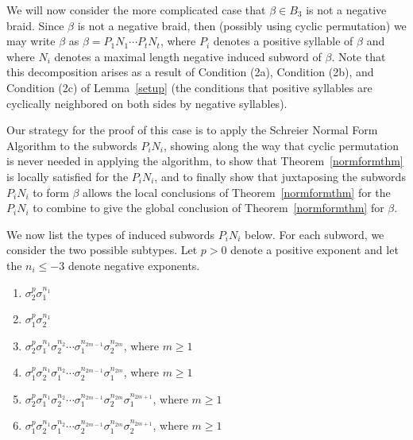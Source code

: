 \documentclass{article}
\begin{document}
We will now consider the more complicated case that $\beta \in B_{3}$ is not a negative braid. Since $\beta$ is not a negative braid, then (possibly using cyclic permutation) we may write $\beta$ as $\beta=P_{1}N_{1} \cdots P_{t}N_{t}$, where $P_{i}$ denotes a positive syllable of $\beta$ and where $N_{i}$ denotes a maximal length negative induced subword of $\beta$. Note that this decomposition arises as a result of Condition (2a), Condition (2b), and Condition (2c) of Lemma~\ref{setup} (the conditions that positive syllables are cyclically neighbored on both sides by negative syllables).

\bigskip

Our strategy for the proof of this case is to apply the Schreier Normal Form Algorithm to the subwords $P_{i}N_{i}$, showing along the way that cyclic permutation is never needed in applying the algorithm, to show that Theorem~\ref{normformthm} is locally satisfied for the $P_{i}N_{i}$, and to finally show that juxtaposing the subwords $P_{i}N_{i}$ to form $\beta$ allows the local conclusions of Theorem~\ref{normformthm} for the $P_{i}N_{i}$ to combine to give the global conclusion of Theorem~\ref{normformthm} for $\beta$. 

\bigskip 

We now list the types of induced subwords $P_{i}N_{i}$ below. For each subword, we consider the two possible subtypes. Let $p>0$ denote a positive exponent and let the $n_{i}\leq-3$ denote negative exponents.   

\begin{enumerate}
	\item[(1a)] $\sigma_{2}^{p}\sigma_{1}^{n_{1}}$
	\item[(1b)] $\sigma_{1}^{p}\sigma_{2}^{n_{1}}$
	\item[(2a)] $\sigma_{2}^{p}\sigma_{1}^{n_{1}}\sigma_{2}^{n_{2}}\cdots\sigma_{1}^{n_{2m-1}}\sigma_{2}^{n_{2m}}$, where $m \geq 1$
	\item[(2b)] $\sigma_{1}^{p}\sigma_{2}^{n_{1}}\sigma_{1}^{n_{2}}\cdots\sigma_{2}^{n_{2m-1}}\sigma_{1}^{n_{2m}}$, where $m \geq 1$
	\item[(3a)] $\sigma_{2}^{p}\sigma_{1}^{n_{1}}\sigma_{2}^{n_{2}}\cdots\sigma_{1}^{n_{2m-1}}\sigma_{2}^{n_{2m}}\sigma_{1}^{n_{2m+1}}$, where $m \geq 1$
	\item[(3b)] $\sigma_{1}^{p}\sigma_{2}^{n_{1}}\sigma_{1}^{n_{2}}\cdots\sigma_{2}^{n_{2m-1}}\sigma_{1}^{n_{2m}}\sigma_{2}^{n_{2m+1}}$, where $m \geq 1$
\end{enumerate}
\end{document}
